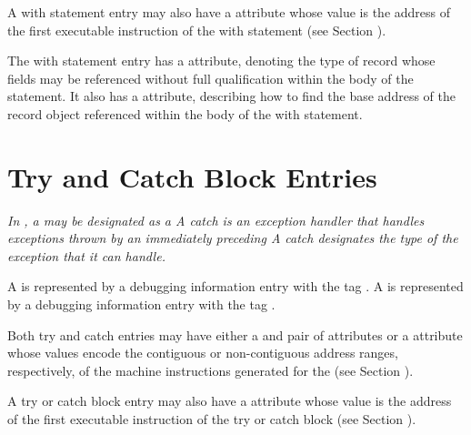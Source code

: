 A\hypertarget{chap:DWATentrypcofwithstmt}{}
with statement entry may also have a
\DWATentrypc{} attribute
whose value is the address of the first executable instruction
of the with statement (see
Section ).

The with statement entry has a
\DWATtype{} attribute, denoting
the type of record whose fields may be referenced without full
qualification within the body of the statement. It also has
a \DWATlocation{} attribute, describing how to find the base
address of the record object referenced within the body of
the with statement.

\section{Try and Catch Block Entries}
\label{chap:tryandcatchblockentries}
\textit{In , a  may be
designated as a 
A catch  is an exception handler that
handles exceptions thrown by an immediately preceding
A catch 
designates the type of the exception that it can handle.}

A  is represented
by a debugging information entry
with the tag \DWTAGtryblockTARG.
A  is represented by
a debugging information entry
with the tag \DWTAGcatchblockTARG.

Both try and catch  entries may have either a
\DWATlowpc{} and
\DWAThighpc{} pair of attributes
or a
\DWATranges{} attribute
whose values encode the contiguous
or non-contiguous address ranges, respectively, of the
machine instructions generated for the 
(see Section ).

A\hypertarget{chap:DWATentrypcoftryblock}{}
try or catch\hypertarget{chap:DWATentrypcofcatchblock}{}
block entry may also have a
\DWATentrypc{} attribute
whose value is the address of the first executable instruction
of the try or catch block
(see Section ).

